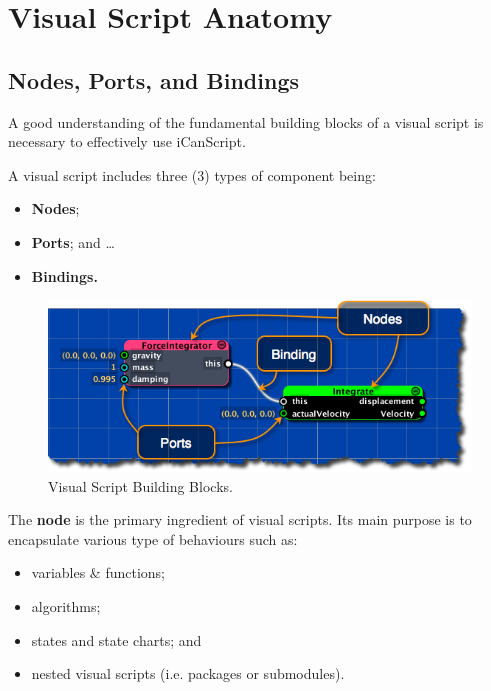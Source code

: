 \pagebreak 

\part{Visual Script Anatomy}
\label{visualscriptanatomy}

\chapter{Nodes, Ports, and Bindings}
\label{nodesportsandbindings}

A good understanding of the fundamental building blocks of a visual script is necessary to effectively use iCanScript.

A visual script includes three (3) types of component being:

\begin{itemize}
\item \textbf{Nodes};

\item \textbf{Ports}; and {\ldots}

\item \textbf{Bindings.}

\end{itemize}

\begin{figure}[htbp]
\centering
\includegraphics[keepaspectratio,width=\textwidth,height=0.75\textheight]{ics-visual-script-building-blocks.png}
\caption{Visual Script Building Blocks.}
\label{ics-visual-script-building-blocks.png}
\end{figure}

The \textbf{node} is the primary ingredient of visual scripts. Its main purpose is to encapsulate various type of behaviours such as:

\begin{itemize}
\item variables \& functions;

\item algorithms;

\item states and state charts; and

\item nested visual scripts (i.e. packages or submodules).

\end{itemize}

